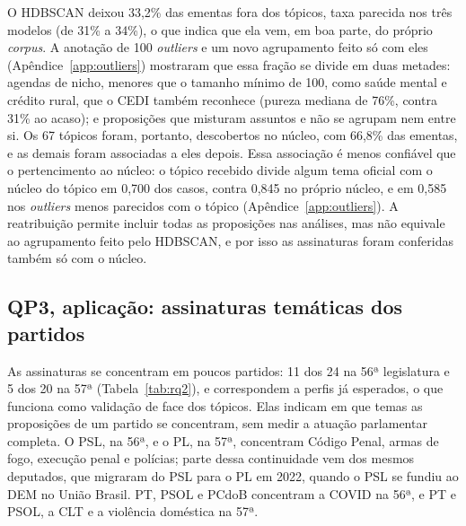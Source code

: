 \documentclass[12pt]{article}
\begin{document}
O HDBSCAN deixou 33,2\% das ementas fora dos tópicos, taxa parecida nos três modelos (de 31\% a 34\%), o que indica que ela vem, em boa parte, do próprio \textit{corpus}. A anotação de 100 \textit{outliers} e um novo agrupamento feito só com eles (Apêndice~\ref{app:outliers}) mostraram que essa fração se divide em duas metades: agendas de nicho, menores que o tamanho mínimo de 100, como saúde mental e crédito rural, que o CEDI também reconhece (pureza mediana de 76\%, contra 31\% ao acaso); e proposições que misturam assuntos e não se agrupam nem entre si. Os 67 tópicos foram, portanto, descobertos no núcleo, com 66,8\% das ementas, e as demais foram associadas a eles depois. Essa associação é menos confiável que o pertencimento ao núcleo: o tópico recebido divide algum tema oficial com o núcleo do tópico em 0,700 dos casos, contra 0,845 no próprio núcleo, e em 0,585 nos \textit{outliers} menos parecidos com o tópico (Apêndice~\ref{app:outliers}). A reatribuição permite incluir todas as proposições nas análises, mas não equivale ao agrupamento feito pelo HDBSCAN, e por isso as assinaturas foram conferidas também só com o núcleo.

\subsection{QP3, aplicação: assinaturas temáticas dos partidos}
\label{subsec:res-rq2}

As assinaturas se concentram em poucos partidos: 11 dos 24 na 56ª legislatura e 5 dos 20 na 57ª (Tabela~\ref{tab:rq2}), e correspondem a perfis já esperados, o que funciona como validação de face dos tópicos. Elas indicam em que temas as proposições de um partido se concentram, sem medir a atuação parlamentar completa. O PSL, na 56ª, e o PL, na 57ª, concentram Código Penal, armas de fogo, execução penal e polícias; parte dessa continuidade vem dos mesmos deputados, que migraram do PSL para o PL em 2022, quando o PSL se fundiu ao DEM no União Brasil. PT, PSOL e PCdoB concentram a COVID na 56ª, e PT e PSOL, a CLT e a violência doméstica na 57ª.
\end{document}
